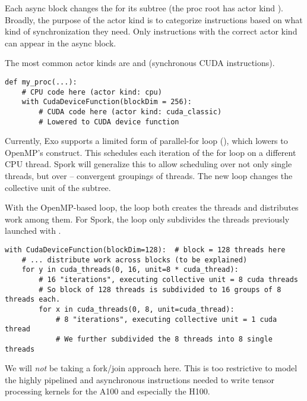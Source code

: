 Each async block changes the  for its subtree (the proc root has actor kind ).
Broadly, the purpose of the actor kind is to categorize instructions based on what kind of synchronization they need.
Only instructions with the correct actor kind can appear in the async block.

The most common actor kinds are  and  (synchronous CUDA instructions).

{\color{lightttColor}
\begin{verbatim}
def my_proc(...):
    # CPU code here (actor kind: cpu)
    with CudaDeviceFunction(blockDim = 256):
        # CUDA code here (actor kind: cuda_classic)
        # Lowered to CUDA device function
\end{verbatim}
}

\filbreak
{}
Currently, Exo supports a limited form of parallel-for loop (), which lowers to OpenMP's  construct.
This schedules each iteration of the for loop on a different CPU thread.
Spork will generalize this to allow scheduling over not only single threads, but over  -- convergent groupings of threads.
The new  loop changes the collective unit of the subtree.

\filbreak
With the OpenMP-based  loop, the loop both creates the threads and distributes work among them.
For Spork, the  loop only subdivides the threads previously launched with .

\filbreak
{\color{lightttColor}
\begin{verbatim}
with CudaDeviceFunction(blockDim=128):  # block = 128 threads here
    # ... distribute work across blocks (to be explained)
    for y in cuda_threads(0, 16, unit=8 * cuda_thread):
        # 16 "iterations", executing collective unit = 8 cuda threads
        # So block of 128 threads is subdivided to 16 groups of 8 threads each.
        for x in cuda_threads(0, 8, unit=cuda_thread):
            # 8 "iterations", executing collective unit = 1 cuda thread
            # We further subdivided the 8 threads into 8 single threads
\end{verbatim}
}

\filbreak
{}
We will \textit{not} be taking a fork/join approach here.
This is too restrictive to model the highly pipelined and asynchronous instructions needed to write tensor processing kernels for the A100 and especially the H100.

